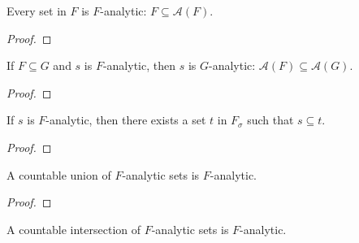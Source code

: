 \begin{lemma}\label{lem:isPavingAnalytic_of_prop}
  \leanok
Every set in $F$ is $F$-analytic: $F \subseteq \mathcal{A}(F)$.
\end{lemma}

\begin{proof}\leanok

\end{proof}


\begin{lemma}\label{lem:IsPavingAnalytic.mono}
  \leanok
If $F \subseteq G$ and $s$ is $F$-analytic, then $s$ is $G$-analytic: $\mathcal{A}(F) \subseteq \mathcal{A}(G)$.
\end{lemma}

\begin{proof}\leanok

\end{proof}


\begin{lemma}\label{lem:IsPavingAnalytic.exists_memSigma_superset}
  \leanok
If $s$ is $F$-analytic, then there exists a set $t$ in $F_\sigma$ such that $s \subseteq t$.
\end{lemma}

\begin{proof}\leanok

\end{proof}


\begin{lemma}\label{lem:IsPavingAnalytic.iUnion}
  \leanok
A countable union of $F$-analytic sets is $F$-analytic.
\end{lemma}

\begin{proof}\leanok

\end{proof}


\begin{lemma}\label{lem:IsPavingAnalytic.iInter}
  \leanok
A countable intersection of $F$-analytic sets is $F$-analytic.
\end{lemma}

